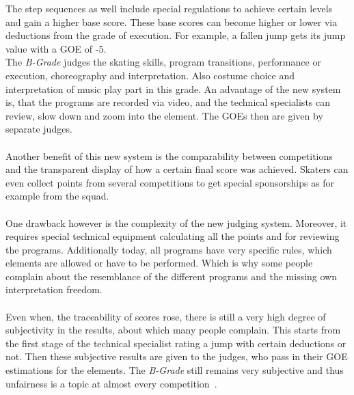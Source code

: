 The step sequences as well include special regulations to achieve certain levels and gain a higher base score.
These base scores can become higher or lower via deductions from the grade of execution.
For example, a fallen jump gets its jump value with a \gls{GOE} of -5.\\
The \textit{B-Grade} judges the skating skills, program transitions, performance or execution, choreography and
interpretation.
Also costume choice and interpretation of music play part in this grade.
An advantage of the new system is, that the programs are recorded via video, and the technical specialists can review,
slow down
and zoom into the element.
The \glspl{GOE} then are given by separate judges.
\\\mbox{}\\
Another benefit of this new system is the comparability between competitions and the transparent display of how a
certain final
score was achieved.
Skaters can even collect points from several competitions to get special sponsorships as for example from the squad.
\\\mbox{}\\
One drawback however is the complexity of the new judging system.
Moreover, it requires special technical equipment calculating all the points and for reviewing the programs.
Additionally today, all programs have very specific rules, which elements are allowed or have to be performed.
Which is why some people complain about the resemblance of the different programs and the missing own interpretation
freedom.
\\\mbox{}\\
Even when, the traceability of scores rose, there is still a very high degree of subjectivity in the results,
about which many people complain.
This starts from the first stage of the technical specialist rating a jump with certain deductions or not.
Then these subjective results are given to the judges, who pass in their \gls{GOE} estimations for the elements.
The \textit{B-Grade} still remains very subjective and thus unfairness is a topic at almost every
competition~\cite{unfairjudge, isujudginssystem, isuguideleinesgoe}.
